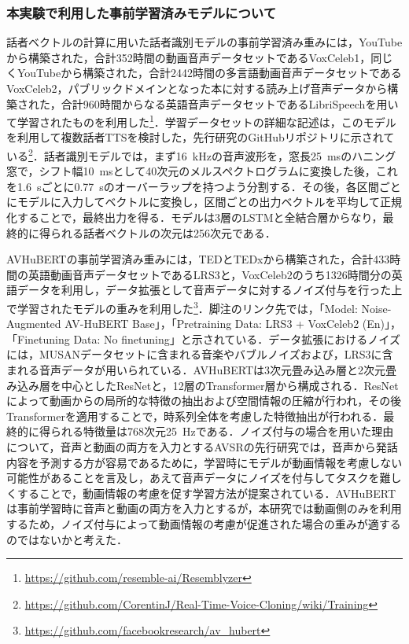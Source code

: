 \subsubsection{本実験で利用した事前学習済みモデルについて}
話者ベクトルの計算に用いた話者識別モデルの事前学習済み重みには，YouTubeから構築された，合計352時間の動画音声データセットであるVoxCeleb1\cite{nagrani2020voxceleb}，同じくYouTubeから構築された，合計2442時間の多言語動画音声データセットであるVoxCeleb2，パブリックドメインとなった本に対する読み上げ音声データから構築された，合計960時間からなる英語音声データセットであるLibriSpeech\cite{panayotov2015librispeech}を用いて学習されたものを利用した\footnote{\url{https://github.com/resemble-ai/Resemblyzer}}．学習データセットの詳細な記述は，このモデルを利用して複数話者TTSを検討した，先行研究\cite{jia2018transfer}のGitHubリポジトリに示されている\footnote{\url{https://github.com/CorentinJ/Real-Time-Voice-Cloning/wiki/Training}}．話者識別モデルでは，まず\SI{16}{\kHz}の音声波形を，窓長\SI{25}{\ms}のハニング窓で，シフト幅\SI{10}{\ms}として40次元のメルスペクトログラムに変換した後，これを\SI{1.6}{\s}ごとに\SI{0.77}{\s}のオーバーラップを持つよう分割する．その後，各区間ごとにモデルに入力してベクトルに変換し，区間ごとの出力ベクトルを平均して正規化することで，最終出力を得る．モデルは3層のLSTMと全結合層からなり，最終的に得られる話者ベクトルの次元は256次元である．

AVHuBERTの事前学習済み重みには，TEDとTEDxから構築された，合計433時間の英語動画音声データセットであるLRS3と，VoxCeleb2のうち1326時間分の英語データを利用し，データ拡張として音声データに対するノイズ付与を行った上で学習されたモデル\cite{shi2022robust}の重みを利用した\footnote{\url{https://github.com/facebookresearch/av_hubert}}．脚注のリンク先では，「Model: Noise-Augmented AV-HuBERT Base」，「Pretraining Data: LRS3 + VoxCeleb2 (En)」，「Finetuning Data: No finetuning」と示されている．データ拡張におけるノイズには，MUSANデータセット\cite{snyder2015musan}に含まれる音楽やバブルノイズおよび，LRS3に含まれる音声データが用いられている．AVHuBERTは3次元畳み込み層と2次元畳み込み層を中心としたResNetと，12層のTransformer層から構成される．ResNetによって動画からの局所的な特徴の抽出および空間情報の圧縮が行われ，その後Transformerを適用することで，時系列全体を考慮した特徴抽出が行われる．最終的に得られる特徴量は768次元\SI{25}{\Hz}である．ノイズ付与の場合を用いた理由について，音声と動画の両方を入力とするAVSRの先行研究\cite{afouras2018deep}では，音声から発話内容を予測する方が容易であるために，学習時にモデルが動画情報を考慮しない可能性があることを言及し，あえて音声データにノイズを付与してタスクを難しくすることで，動画情報の考慮を促す学習方法が提案されている．AVHuBERTは事前学習時に音声と動画の両方を入力とするが，本研究では動画側のみを利用するため，ノイズ付与によって動画情報の考慮が促進された場合の重みが適するのではないかと考えた．

